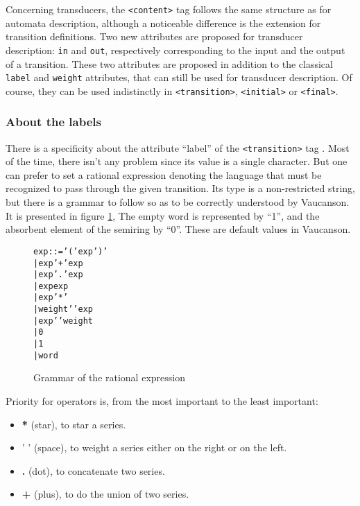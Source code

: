 \documentclass[a4paper]{article}
\newcommand{\Vauc}{{\sc Vaucanson}\xspace}
\def\contenttag{\texttt{<content>}}
\def\transitiontag{\texttt{<transition>}}
\def\finaltag{\texttt{<final>}}
\def\initialtag{\texttt{<initial>}}
\begin{document}
Concerning transducers, the \contenttag{} tag follows the same structure as
for automata description, although a noticeable difference is the extension for
transition definitions. Two new attributes are proposed for transducer
description: \verb|in| and \verb|out|, respectively corresponding to
the input and the output of a transition. These two attributes are
proposed in addition to the classical \verb|label| and \verb|weight|
attributes, that can still be used for transducer description. Of course, they
can be used indistinctly in \transitiontag{}, \initialtag{} or \finaltag{}.

\subsubsection{About the labels}

There is a specificity about the attribute ``label'' of the \transitiontag{}
tag . Most of the time, there isn't any problem since its value is a single
character. But one can prefer to set a rational expression denoting the
language that must be recognized to pass through the given transition. Its
type is a non-restricted string, but there is a grammar to follow so as to be correctly
understood by \Vauc. It is presented in figure \ref{Grammar}, The empty word
is represented by ``1'', and the absorbent element of the semiring by ``0''.
These are default values in \Vauc.

{\small

\begin{figure}[h]
  \begin{center}
\begin{alltt}
     exp ::= '(' exp ')'
         |   exp '+' exp
         |   exp '.' exp
         |   exp exp
         |   exp '*'
         |   weight ' ' exp
         |   exp ' ' weight
         |   0
         |   1
         |   word
\end{alltt}

\caption{Grammar of the rational expression}
\label{Grammar}
  \end{center}
\end{figure}
}

Priority for operators is, from the most important to the least
important:
\begin{itemize}
\item \textbf{*} (star), to star a series.
\item ' ' (space), to weight a series either on the right or on the left.
\item \textbf{.} (dot), to concatenate two series.
\item \textbf{+} (plus), to do the union of two series.
\end{itemize}
\end{document}

